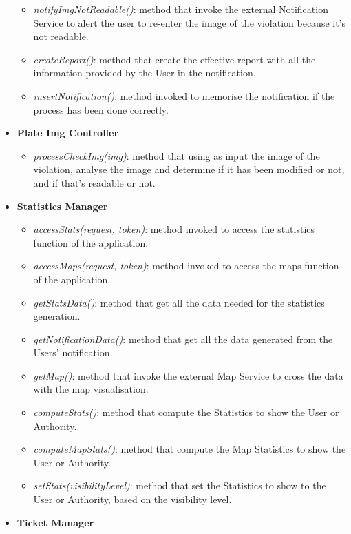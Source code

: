 \documentclass{article}
\begin{document}
\begin{itemize}
\begin{itemize}
        		\item {\it notifyImgNotReadable()}: method that invoke the external Notification Service to alert the user to re-enter the image of the violation because it's not readable.
        		\item {\it createReport()}: method that create the effective report with all the information provided by the User in the notification. 
        		\item {\it insertNotification()}: method invoked to memorise the notification if the process has been done correctly.
    		\end{itemize}
    	\item {\bf Plate Img Controller}
    		\begin{itemize}
        		\item {\it processCheckImg(img)}: method that using as input the image of the violation, analyse the image and determine if it has been modified or not, and if that's readable or not.  
        	\end{itemize}
    	\item {\bf Statistics Manager}
    		\begin{itemize}
        		\item {\it accessStats(request, token)}: method invoked to access the statistics function of the application.
        		\item {\it accessMaps(request, token)}: method invoked to access the maps function of the application.
        		\item {\it getStatsData()}: method that get all the data needed for the statistics generation.
        		\item {\it getNotificationData()}: method that get all the data generated from the Users' notification.
        		\item {\it getMap()}: method that invoke the external Map Service to cross the data with the map visualisation.
        		\item {\it computeStats()}: method that compute the Statistics to show the User or Authority.
        		\item {\it computeMapStats()}: method that compute the Map Statistics to show the User or Authority.
        		\item {\it setStats(visibilityLevel)}: method that set the Statistics to show to the User or Authority, based on the visibility level. 
    		\end{itemize}
    	\item {\bf Ticket Manager}

\end{itemize}
\end{document}
